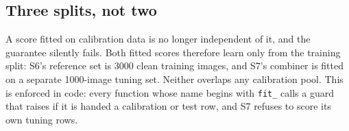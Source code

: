 \subsection{Three splits, not two}

A score fitted on calibration data is no longer independent of it, and the
guarantee silently fails. Both fitted scores therefore learn only from
the training split: S6's reference set is 3000 clean training images, and
S7's combiner is fitted on a separate 1000-image tuning set. Neither
overlaps any calibration pool. This is enforced in code: every
function whose name begins with \texttt{fit\_} calls a guard that raises if
it is handed a calibration or test row, and S7 refuses to score its own
tuning rows.
